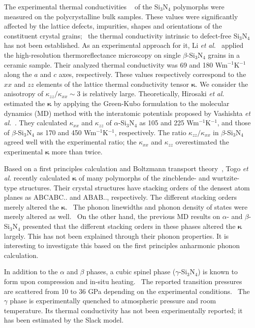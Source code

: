 \documentclass[twocolumn,amsmath,amssymb,a4paper,prb,superscriptaddress,floatfix]{revtex4-1}
\begin{document}
The experimental thermal conductivities
~\cite{zhou,hirao-rev,watari,hirosaki,hirai} of the Si$_3$N$_4$ polymorphs were
measured on the polycrystalline bulk samples. These values were significantly
affected by the lattice defects, impurities, shapes and orientations of the
constituent crystal grains;~\cite{hirosaki-md} the thermal conductivity
intrinsic to defect-free Si$_3$N$_4$ has not been established. As an
experimental approach for it, Li {\it et al.}~\cite{li} applied the
high-resolution thermoreflectance microscopy on single $\beta$-Si$_3$N$_4$
grains in a ceramic sample. Their analyzed thermal conductivity was 69 and 180
Wm$^{-1}$K$^{-1}$ along the $a$ and $c$ axes, respectively.  These values
respectively correspond to the $xx$ and $zz$ elements of the lattice thermal
conductivity tensor $\boldsymbol{\kappa}$. We consider the anisotropy of
$\kappa_{zz}/\kappa_{xx}\sim 3$ is relatively large.  Theoretically, Hirosaki
{\it et al.}~\cite{hirosaki-md} estimated the $\boldsymbol{\kappa}$ by applying
the Green-Kubo formulation to the molecular dynamics (MD) method with the
interatomic potentials proposed by Vashishta {\it et al.}~\cite{vashishta}.
They calculated $\kappa$$_{xx}$ and $\kappa$$_{zz}$ of $\alpha$-Si$_3$N$_4$ as
105 and 225 Wm$^{-1}$K$^{-1}$, and those of $\beta$-Si$_3$N$_4$ as 170 and 450
Wm$^{-1}$K$^{-1}$, respectively.  The ratio $\kappa_{zz}/\kappa_{xx}$ in
$\beta$-Si$_3$N$_4$ agreed well with the experimental ratio; the $\kappa_{xx}$
and $\kappa_{zz}$ overestimated the experimental $\boldsymbol{\kappa}$ more than
twice. 

Based on a first principles calculation and Boltzmann transport
theory~\cite{phono3py}, Togo {\it{et al.}} recently calculated
$\boldsymbol{\kappa}$ of many polymorphs of the zincblende- and wurtzite-type
structures. Their crystal structures have stacking orders of the densest atom
planes as ABCABC.. and ABAB.., respectively. The different stacking orders
merely altered the $\boldsymbol{\kappa}$.~\cite{phono3py} The phonon linewidths
and phonon density of states were merely altered as well.~\cite{phono3py} On the
other hand, the previous MD results on $\alpha$- and $\beta$-Si$_3$N$_4$
presented that the different stacking orders in these phases altered the
$\boldsymbol{\kappa}$ largely. This has not been explained through their phonon
properties.  It is interesting to investigate this based on the first principles
anharmonic phonon calculation.

In addition to the $\alpha$ and $\beta$ phases, a cubic spinel phase
($\gamma$-Si$_3$N$_4$) is known to form upon compression and in-situ
heating.~\cite{zerr,zhang} The reported transition pressures are scattered from
10 to 36 GPa depending on the experimental conditions.~\cite{xu}  The $\gamma$
phase is experimentally quenched to atmospheric pressure and room temperature.
Its thermal conductivity has not been experimentally reported; it has been
estimated by the Slack model.~\cite{morelli} 
\end{document}

